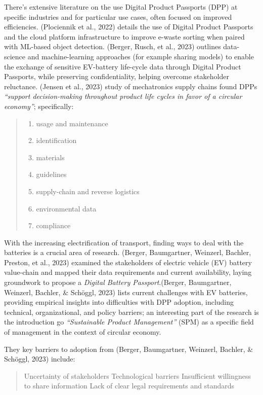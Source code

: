 \documentclass[
  12pt,
  letterpaper,
  DIV=11,
  numbers=noendperiod]{scrartcl}
\providecommand{\tightlist}{%
  \setlength{\itemsep}{0pt}\setlength{\parskip}{0pt}}
\begin{document}
There's extensive literature on the use Digital Product Passports (DPP)
at specific industries and for particular use cases, often focused on
improved efficiencies. (Plociennik et al., 2022) details the use of
Digital Product Passports and the cloud platform infrastructure to
improve e-waste sorting when paired with ML-based object detection.
(Berger, Rusch, et al., 2023) outlines data-science and machine-learning
approaches (for example sharing models) to enable the exchange of
sensitive EV-battery life-cycle data through Digital Product Passports,
while preserving confidentiality, helping overcome stakeholder
reluctance. (Jensen et al., 2023) study of mechatronics supply chains
found DPPs \emph{``support decision-making throughout product life
cycles in favor of a circular economy''}; specifically:

\begin{quote}
\begin{enumerate}
\def\labelenumi{(\arabic{enumi})}
\tightlist
\item
  usage and maintenance
\item
  identification
\item
  materials
\item
  guidelines
\item
  supply-chain and reverse logistics
\item
  environmental data
\item
  compliance
\end{enumerate}
\end{quote}

With the increasing electrification of transport, finding ways to deal
with the batteries is a crucial area of research. (Berger, Baumgartner,
Weinzerl, Bachler, Preston, et al., 2023) examined the stakeholders of
electric vehicle (EV) battery value-chain and mapped their data
requirements and current availability, laying groundwork to propose a
\emph{Digital Battery Passport}.(Berger, Baumgartner, Weinzerl, Bachler,
\& Schöggl, 2023) lists current challenges with EV batteries, providing
empirical insights into difficulties with DPP adoption, including
technical, organizational, and policy barriers; an interesting part of
the research is the introduction go \emph{``Sustainable Product
Management''} (SPM) as a specific field of management in the context of
circular economy.

They key barriers to adoption from (Berger, Baumgartner, Weinzerl,
Bachler, \& Schöggl, 2023) include:

\begin{quote}
Uncertainty of stakeholders Technological barriers Insufficient
willingness to share information Lack of clear legal requirements and
standards
\end{quote}
\end{document}
